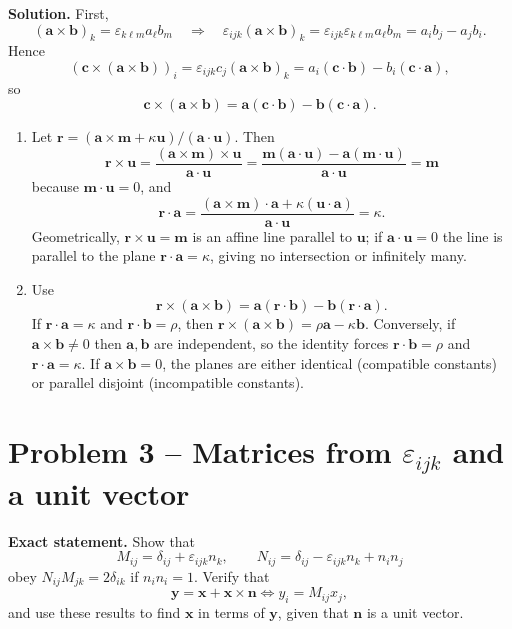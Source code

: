\documentclass[12pt,a4paper]{article}
\theoremstyle{plain}
\theoremstyle{definition}      %
\begin{document}
\textbf{Solution.}
First,
\[
(\mathbf a\times\mathbf b)_k=\varepsilon_{k\ell m}a_\ell b_m
\quad\Rightarrow\quad
\varepsilon_{ijk}(\mathbf a\times\mathbf b)_k
=\varepsilon_{ijk}\varepsilon_{k\ell m}a_\ell b_m
=a_ib_j-a_jb_i.
\]
Hence
\[
(\mathbf c\times(\mathbf a\times\mathbf b))_i
=\varepsilon_{ijk}c_j(\mathbf a\times\mathbf b)_k
=a_i(\mathbf c\cdot\mathbf b)-b_i(\mathbf c\cdot\mathbf a),
\]
so
\[
\mathbf c\times(\mathbf a\times\mathbf b)=\mathbf a(\mathbf c\cdot\mathbf b)-\mathbf b(\mathbf c\cdot\mathbf a).
\]

\begin{enumerate}[label=(\alph*)]
	\item Let $\mathbf r=(\mathbf a\times\mathbf m+\kappa\mathbf u)/(\mathbf a\cdot\mathbf u)$. Then
	\[
	\mathbf r\times\mathbf u
	=\frac{(\mathbf a\times\mathbf m)\times\mathbf u}{\mathbf a\cdot\mathbf u}
	=\frac{\mathbf m(\mathbf a\cdot\mathbf u)-\mathbf a(\mathbf m\cdot\mathbf u)}{\mathbf a\cdot\mathbf u}
	=\mathbf m
	\]
	because $\mathbf m\cdot\mathbf u=0$, and
	\[
	\mathbf r\cdot\mathbf a
	=\frac{(\mathbf a\times\mathbf m)\cdot\mathbf a+\kappa(\mathbf u\cdot\mathbf a)}{\mathbf a\cdot\mathbf u}
	=\kappa.
	\]
	Geometrically, $\mathbf r\times\mathbf u=\mathbf m$ is an affine line parallel to $\mathbf u$; if $\mathbf a\cdot\mathbf u=0$ the line is parallel to the plane $\mathbf r\cdot\mathbf a=\kappa$, giving no intersection or infinitely many.
	\item Use
	\[
	\mathbf r\times(\mathbf a\times\mathbf b)=\mathbf a(\mathbf r\cdot\mathbf b)-\mathbf b(\mathbf r\cdot\mathbf a).
	\]
	If $\mathbf r\cdot\mathbf a=\kappa$ and $\mathbf r\cdot\mathbf b=\rho$, then
	$\mathbf r\times(\mathbf a\times\mathbf b)=\rho\mathbf a-\kappa\mathbf b$.
	Conversely, if $\mathbf a\times\mathbf b\neq 0$ then $\mathbf a,\mathbf b$ are independent, so the identity forces
	$\mathbf r\cdot\mathbf b=\rho$ and $\mathbf r\cdot\mathbf a=\kappa$.
	If $\mathbf a\times\mathbf b=0$, the planes are either identical (compatible constants) or parallel disjoint (incompatible constants).
\end{enumerate}

\section*{Problem 3 -- Matrices from $\varepsilon_{ijk}$ and a unit vector}

\textbf{Exact statement.}
Show that
\[
M_{ij}=\delta_{ij}+\varepsilon_{ijk}n_k,\qquad
N_{ij}=\delta_{ij}-\varepsilon_{ijk}n_k+n_in_j
\]
obey $N_{ij}M_{jk}=2\delta_{ik}$ if $n_in_i=1$.
Verify that
\[
\mathbf y=\mathbf x+\mathbf x\times\mathbf n \iff y_i=M_{ij}x_j,
\]
and use these results to find $\mathbf x$ in terms of $\mathbf y$, given that $\mathbf n$ is a unit vector.
\end{document}
